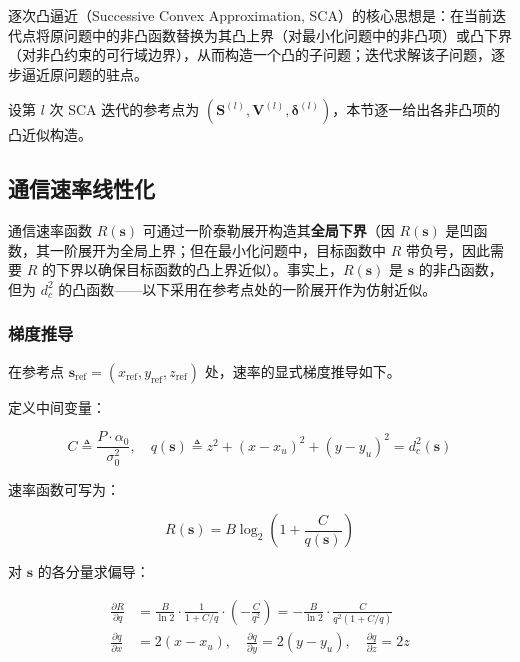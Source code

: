 逐次凸逼近（Successive Convex Approximation, SCA）的核心思想是：在当前迭代点将原问题中的非凸函数替换为其凸上界（对最小化问题中的非凸项）或凸下界（对非凸约束的可行域边界），从而构造一个凸的子问题；迭代求解该子问题，逐步逼近原问题的驻点\cite{Zeng2016}。

设第 $l$ 次 SCA 迭代的参考点为 $(\mathbf{S}^{(l)},\mathbf{V}^{(l)},\bm{\delta}^{(l)})$，本节逐一给出各非凸项的凸近似构造。

\subsection{通信速率线性化}
\label{sec:rate_linear}

通信速率函数 $R(\mathbf{s})$ 可通过一阶泰勒展开构造其\textbf{全局下界}（因 $R(\mathbf{s})$ 是凹函数，其一阶展开为全局上界；但在最小化问题中，目标函数中 $R$ 带负号，因此需要 $R$ 的下界以确保目标函数的凸上界近似）。事实上，$R(\mathbf{s})$ 是 $\mathbf{s}$ 的非凸函数，但为 $d_c^2$ 的凸函数——以下采用在参考点处的一阶展开作为仿射近似。

\subsubsection{梯度推导}

在参考点 $\mathbf{s}_{\mathrm{ref}}=(x_{\mathrm{ref}},y_{\mathrm{ref}},z_{\mathrm{ref}})$ 处，速率的显式梯度推导如下。

定义中间变量：

\begin{equation}
C\triangleq\frac{P\cdot\alpha_0}{\sigma_0^2},\quad
q(\mathbf{s})\triangleq z^2+(x-x_u)^2+(y-y_u)^2=d_c^2(\mathbf{s})
\label{eq:intermediate_q}
\end{equation}

速率函数可写为：

\begin{equation}
R(\mathbf{s})=B\log_2\!\left(1+\frac{C}{q(\mathbf{s})}\right)
\label{eq:rate_q}
\end{equation}

对 $\mathbf{s}$ 的各分量求偏导：

\begin{align}
\frac{\partial R}{\partial q}&=\frac{B}{\ln 2}\cdot\frac{1}{1+C/q}\cdot\left(-\frac{C}{q^2}\right)
=-\frac{B}{\ln 2}\cdot\frac{C}{q^2(1+C/q)}
\label{eq:dR_dq}\\[4pt]
\frac{\partial q}{\partial x}&=2(x-x_u),\quad
\frac{\partial q}{\partial y}=2(y-y_u),\quad
\frac{\partial q}{\partial z}=2z
\label{eq:dq_ds}
\end{align}

